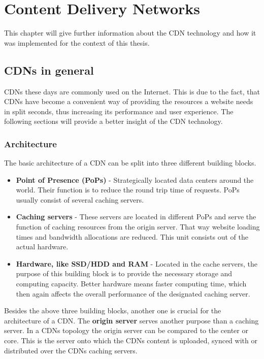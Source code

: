 \chapter{Content Delivery Networks} %
\label{Chapter3}


This chapter will give further information about the CDN technology and how it was implemented for the context of this thesis.

\section{CDNs in general}

CDNs these days are commonly used on the Internet. This is due to the fact, that CDNs have become a convenient way of providing the resources a website needs in split seconds, thus increasing its performance and user experience.\cite{cdn_general}
The following sections will provide a better insight of the CDN technology.

\subsection{Architecture}

The basic architecture of a CDN can be split into three different building blocks.

\begin{itemize}
	\item \textbf{Point of Presence (PoPs)} - Strategically located data centers around the world. Their function is to reduce the round trip time of requests. PoPs usually consist of several caching servers.
	\item \textbf{Caching servers} - These servers are located in different PoPs and serve the function of caching resources from the origin server. That way website loading times and bandwidth allocations are reduced. This unit consists out of the actual hardware.
	\item \textbf{Hardware, like SSD/HDD and RAM} - Located in the cache servers, the purpose of this building block is to provide the necessary storage and computing capacity. Better hardware means faster computing time, which then again affects the overall performance of the designated caching server.
\end{itemize}

Besides the above three building blocks, another one is crucial for the architecture of a CDN. The \textbf{origin server} serves another purpose than a caching server. In a CDNs topology the origin server can be compared to the center or core. This is the server onto which the CDNs content is uploaded, synced with or distributed over the CDNs caching servers.\cite{cdn_origin_server}

